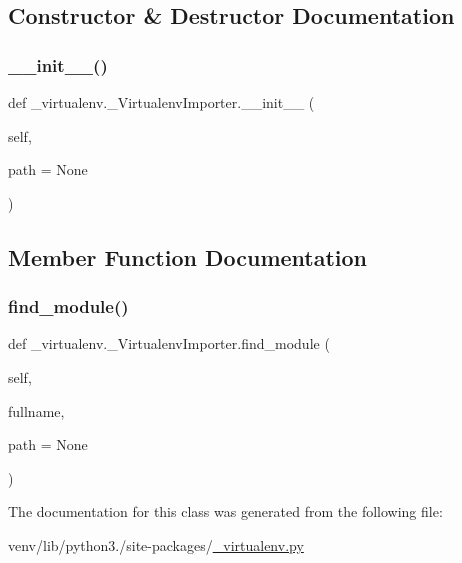 \subsection{Constructor \& Destructor Documentation}
\mbox{\label{class__virtualenv_1_1__VirtualenvImporter_a51bd902a6bf731ad04e98b638748405c}} 
\subsubsection{\texorpdfstring{\+\_\+\+\_\+init\+\_\+\+\_\+()}{\_\_init\_\_()}}
{\footnotesize\ttfamily def \+\_\+virtualenv.\+\_\+\+Virtualenv\+Importer.\+\_\+\+\_\+init\+\_\+\+\_\+ (\begin{DoxyParamCaption}\item[{}]{self,  }\item[{}]{path = {\ttfamily None} }\end{DoxyParamCaption})}



\subsection{Member Function Documentation}
\mbox{\label{class__virtualenv_1_1__VirtualenvImporter_ae0afa3f09678a0b164440095ea3cd451}} 
\subsubsection{\texorpdfstring{find\+\_\+module()}{find\_module()}}
{\footnotesize\ttfamily def \+\_\+virtualenv.\+\_\+\+Virtualenv\+Importer.\+find\+\_\+module (\begin{DoxyParamCaption}\item[{}]{self,  }\item[{}]{fullname,  }\item[{}]{path = {\ttfamily None} }\end{DoxyParamCaption})}



The documentation for this class was generated from the following file\+:\begin{DoxyCompactItemize}
\item 
venv/lib/python3./site-\/packages/\hyperlink{__virtualenv_8py}{\+\_\+virtualenv.\+py}\end{DoxyCompactItemize}

